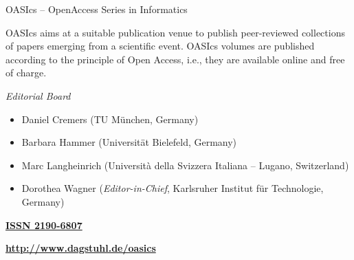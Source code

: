 \documentclass[a4paper,UKenglish]{oasicsmaster-v2016}
\begin{document}
\begin{publicationinfo}
{\Large OASIcs -- OpenAccess Series in Informatics}
 
\bigskip
 
OASIcs aims at a suitable publication venue to publish peer-reviewed collections of papers emerging from a scientific event.
OASIcs volumes are published according to the principle of Open Access, i.e., they are available online and free of charge. 
 
\bigskip
\bigskip
\bigskip
 
\emph{Editorial Board}

\begin{itemize}
\item Daniel Cremers (TU M\"unchen, Germany)
\item Barbara Hammer (Universit\"at Bielefeld, Germany)
\item Marc Langheinrich (Universit\`a della Svizzera Italiana -- Lugano, Switzerland)
\item Dorothea Wagner (\emph{Editor-in-Chief}, Karlsruher Institut f\"{u}r Technologie, Germany)
 \end{itemize}
 
\bigskip
\bigskip
\bigskip

{\large\bf\sffamily \href{http://www.dagstuhl.de/dagpub/2190-6807}{ISSN 2190-6807}}

\bigskip
\bigskip
\bigskip

{\Large\bf\sffamily \href{http://www.dagstuhl.de/oasics}{http://www.dagstuhl.de/oasics}}
 
\vfill

 
\newpage
 
\thispagestyle{empty}

\ \\

\end{publicationinfo}


\end{document}
